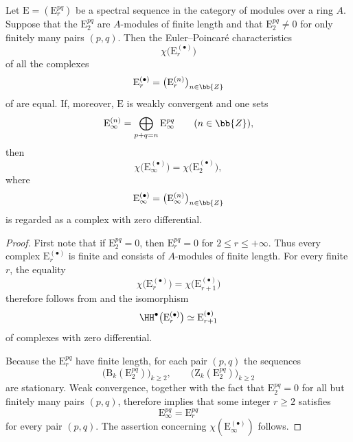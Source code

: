 \begin{corollary}[11.10.3]
\label{0.11.10.3}
Let $\mathrm{E}=(\mathrm{E}_r^{pq})$ be a spectral sequence in the
category of modules over a ring $A$.
Suppose that the $\mathrm{E}_2^{pq}$ are $A$-modules of finite length and
that $\mathrm{E}_2^{pq}\neq0$ for only finitely many pairs $(p,q)$.
Then the Euler--Poincar\'e characteristics
\[
  \chi\bigl(\mathrm{E}_r^{(\bullet)}\bigr)
\]
of all the complexes
\[
  \mathrm{E}_r^{(\bullet)}
  =
  \bigl(\mathrm{E}_r^{(n)}\bigr)_{n\in\bb{Z}}
\]
of  are equal.
If, moreover, $\mathrm{E}$ is weakly convergent and one sets
\[
  \mathrm{E}_\infty^{(n)}
  =
  \bigoplus_{p+q=n}\mathrm{E}_\infty^{pq}
  \qquad(n\in\bb{Z}),
\]
then
\[
  \chi\bigl(\mathrm{E}_\infty^{(\bullet)}\bigr)
  =
  \chi\bigl(\mathrm{E}_2^{(\bullet)}\bigr),
\]
where
\[
  \mathrm{E}_\infty^{(\bullet)}
  =
  \bigl(\mathrm{E}_\infty^{(n)}\bigr)_{n\in\bb{Z}}
\]
is regarded as a complex with zero differential.
\end{corollary}

\begin{proof}
First note that if $\mathrm{E}_2^{pq}=0$, then
$\mathrm{E}_r^{pq}=0$ for $2\leq r\leq+\infty$.
Thus every complex $\mathrm{E}_r^{(\bullet)}$ is finite and consists of
$A$-modules of finite length.
For every finite $r$, the equality
\[
  \chi\bigl(\mathrm{E}_r^{(\bullet)}\bigr)
  =
  \chi\bigl(\mathrm{E}_{r+1}^{(\bullet)}\bigr)
\]
therefore follows from  and the isomorphism
\[
  \HH^\bullet\bigl(\mathrm{E}_r^{(\bullet)}\bigr)
  \simeq
  \mathrm{E}_{r+1}^{(\bullet)}
\]
of complexes with zero differential.

Because the $\mathrm{E}_r^{pq}$ have finite length, for each pair
$(p,q)$ the sequences
\[
  \bigl(\mathrm{B}_k(\mathrm{E}_2^{pq})\bigr)_{k\geq2},
  \qquad
  \bigl(\mathrm{Z}_k(\mathrm{E}_2^{pq})\bigr)_{k\geq2}
\]
are stationary.
Weak convergence, together with the fact that
$\mathrm{E}_2^{pq}=0$ for all but finitely many pairs $(p,q)$, therefore
implies that some integer $r\geq2$ satisfies
\[
  \mathrm{E}_\infty^{pq}=\mathrm{E}_r^{pq}
\]
for every pair $(p,q)$.
The assertion concerning
$\chi(\mathrm{E}_\infty^{(\bullet)})$ follows.
\end{proof}
